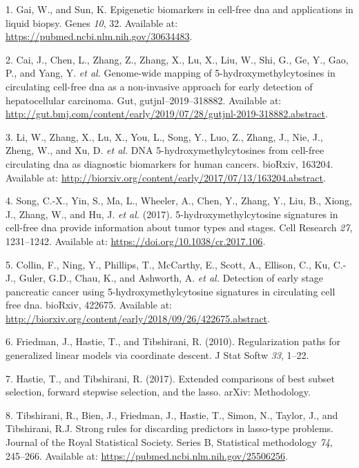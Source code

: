 \documentclass[
]{book}
\newenvironment{cslreferences}%
  {}%
  {\par}
\begin{document}
\hypertarget{refs}{}
\begin{cslreferences}
\leavevmode\hypertarget{ref-Gai:2019aa}{}%
1. Gai, W., and Sun, K. Epigenetic biomarkers in cell-free dna and applications in liquid biopsy. Genes \emph{10}, 32. Available at: \url{https://pubmed.ncbi.nlm.nih.gov/30634483}.

\leavevmode\hypertarget{ref-Cai:2019aa}{}%
2. Cai, J., Chen, L., Zhang, Z., Zhang, X., Lu, X., Liu, W., Shi, G., Ge, Y., Gao, P., and Yang, Y. \emph{et al.} Genome-wide mapping of 5-hydroxymethylcytosines in circulating cell-free dna as a non-invasive approach for early detection of hepatocellular carcinoma. Gut, gutjnl--2019--318882. Available at: \url{http://gut.bmj.com/content/early/2019/07/28/gutjnl-2019-318882.abstract}.

\leavevmode\hypertarget{ref-Li:2017aa}{}%
3. Li, W., Zhang, X., Lu, X., You, L., Song, Y., Luo, Z., Zhang, J., Nie, J., Zheng, W., and Xu, D. \emph{et al.} DNA 5-hydroxymethylcytosines from cell-free circulating dna as diagnostic biomarkers for human cancers. bioRxiv, 163204. Available at: \url{http://biorxiv.org/content/early/2017/07/13/163204.abstract}.

\leavevmode\hypertarget{ref-Song:2017aa}{}%
4. Song, C.-X., Yin, S., Ma, L., Wheeler, A., Chen, Y., Zhang, Y., Liu, B., Xiong, J., Zhang, W., and Hu, J. \emph{et al.} (2017). 5-hydroxymethylcytosine signatures in cell-free dna provide information about tumor types and stages. Cell Research \emph{27}, 1231--1242. Available at: \url{https://doi.org/10.1038/cr.2017.106}.

\leavevmode\hypertarget{ref-Collin:2018aa}{}%
5. Collin, F., Ning, Y., Phillips, T., McCarthy, E., Scott, A., Ellison, C., Ku, C.-J., Guler, G.D., Chau, K., and Ashworth, A. \emph{et al.} Detection of early stage pancreatic cancer using 5-hydroxymethylcytosine signatures in circulating cell free dna. bioRxiv, 422675. Available at: \url{http://biorxiv.org/content/early/2018/09/26/422675.abstract}.

\leavevmode\hypertarget{ref-Friedman:2010aa}{}%
6. Friedman, J., Hastie, T., and Tibshirani, R. (2010). Regularization paths for generalized linear models via coordinate descent. J Stat Softw \emph{33}, 1--22.

\leavevmode\hypertarget{ref-Hastie:2017aa}{}%
7. Hastie, T., and Tibshirani, R. (2017). Extended comparisons of best subset selection, forward stepwise selection, and the lasso. arXiv: Methodology.

\leavevmode\hypertarget{ref-Tibshirani:2012aa}{}%
8. Tibshirani, R., Bien, J., Friedman, J., Hastie, T., Simon, N., Taylor, J., and Tibshirani, R.J. Strong rules for discarding predictors in lasso-type problems. Journal of the Royal Statistical Society. Series B, Statistical methodology \emph{74}, 245--266. Available at: \url{https://pubmed.ncbi.nlm.nih.gov/25506256}.


\end{cslreferences}
\end{document}
